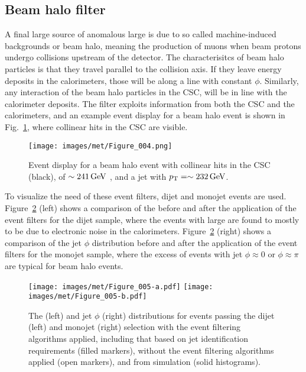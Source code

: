 \subsection{Beam halo filter}
A final large source of anomalous large \ptmiss is due to so called machine-induced backgrounds or beam halo, meaning the production of muons when beam protons undergo collisions upstream of the detector. 
The characterisitcs of beam halo particles is that they travel parallel to the collision axis. 
If they leave energy deposits in the calorimeters, those will be along a line with constant $\phi$. 
Similarly, any interaction of the beam halo particles in the CSC, will be in line with the calorimeter deposits.  
The filter exploits information from both the CSC and the calorimeters, and an example event display for a beam halo event is shown in Fig.~\ref{fig:beamhalo}, where collinear hits in the CSC are visible. 
\begin{figure}[!htp]
\centering
\texttt{[image: images/met/Figure\_004.png]}
\caption{Event display for a beam halo event with collinear hits in the CSC (black), \ptmiss of $\sim241\,\text{Ge\hspace{-.08em}V}$ , and a jet with $p_{\mathrm{T}}=\sim232\,\text{Ge\hspace{-.08em}V}$.}
\label{fig:beamhalo}
\end{figure}
To visualize the need of these event filters, dijet and monojet events are used. 
Figure~\ref{fig:dijet} (left) shows a comparison of the \ptmiss before and after the application of the event filters for the dijet sample, where the events with large \ptmiss are found to mostly to be due to electronic noise in the calorimeters.
Figure~\ref{fig:dijet} (right) shows a comparison of the jet $\phi$ distribution before and after the application of the event filters for the monojet sample, where the excess of events with jet $\phi\approx 0$ or $\phi\approx\pi$ are typical for beam halo events. 
\begin{figure}[!htp]
\centering
\texttt{[image: images/met/Figure\_005-a.pdf]}
\texttt{[image: images/met/Figure\_005-b.pdf]}
\caption{The \ptmiss (left) and jet $\phi$ (right) distributions for events passing the dijet (left) and monojet (right) selection with the event filtering algorithms applied, including that based
on jet identification requirements (filled markers), without the event filtering algorithms applied (open markers), and from simulation (solid histograms). }
\label{fig:dijet}
\end{figure}                                                                                                                                                                                    
